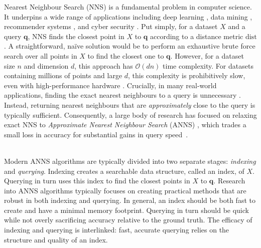 \documentclass{article}
\newcommand{\bq}{\mathbf{q}}
\newcommand{\dist}{\mathrm{dist}}
\newcommand{\bigO}{\mathcal{O}}
\begin{document}
Nearest Neighbour Search (NNS) is a fundamental problem in computer science. It underpins a wide range of applications including deep learning \cite{dwibedi2021little,chakravarthy2023deep,raj2022estimation,archana2023novel}, data mining \cite{xu2022outlier,sun2022out,dang2021nearest}, recommender systems \cite{sarwar2001item,latifi2022sequential,meng2020pmd,chen2022approximate}, and cyber security \cite{gu2024hierarchical}. Put simply, for a dataset $X$ and a query $\bq$, NNS finds the closest point in $X$ to $\bq$ according to a distance metric $\dist$. A straightforward, naïve solution would be to perform an exhaustive brute force search over all points in $X$ to find the closest one to $\bq$. However, for a dataset size $n$ and dimension $d$, this approach has $\bigO(dn)$ time complexity. For datasets containing millions of points and large $d$, this complexity is prohibitively slow, even with high-performance hardware \cite{weber1998quantitative}. Crucially, in many real-world applications, finding the exact nearest neighbours to a query is unnecessary \cite{har2012approximate,halder2024enhancing}. Instead, returning nearest neighbours that are \textit{approximately} close to the query is typically sufficient. Consequently, a large body of research has focused on relaxing exact NNS to \emph{Approximate Nearest Neighbour Search} (ANNS) \cite{indyk1998approximate}, which trades a small loss in accuracy for substantial gains in query speed~\cite{aumuller2023recent}. 

\\ 

Modern ANNS algorithms are typically divided into two separate stages: \emph{indexing} and \emph{querying}. Indexing creates a searchable data structure, called an index, of $ X$. Querying in turn uses this index to find the closest points in $X$ to $\bq$. Research into ANNS algorithms typically focuses on creating practical methods that are robust in both indexing and querying. In general, an index should be both fast to create and have a minimal memory footprint. Querying in turn should be quick while not overly sacrificing accuracy relative to the ground truth. The efficacy of indexing and querying is interlinked: fast, accurate querying relies on the structure and quality of an index.
\end{document}
